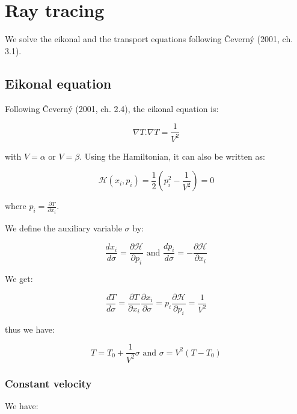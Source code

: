 \documentclass[methods.tex]{subfiles}
\begin{document}
\section{Ray tracing}

We solve the eikonal and the transport equations following \v Cevern\'y (2001, ch. 3.1).

\subsection{Eikonal equation}

Following \v Cevern\'y (2001, ch. 2.4), the eikonal equation is:

\begin{equation}
\nabla T . \nabla T = \frac{1}{V^2}
\end{equation}

with $V = \alpha$ or $V= \beta$. Using the Hamiltonian, it can also be written as:

\begin{equation}
\mathcal H (x_i, p_i) = \frac{1}{2} (p_i^2 - \frac{1}{V^2}) = 0
\end{equation}

where $p_i = \frac{\partial T}{\partial x_i}$.

We define the auxiliary variable $\sigma$ by:

\begin{equation}
\frac{dx_i}{d\sigma} = \frac{\partial \mathcal H}{\partial p_i} \text{ and } \frac{dp_i}{d\sigma} = - \frac{\partial \mathcal H}{\partial x_i}
\end{equation}

We get:

\begin{equation}
\frac{dT}{d\sigma} = \frac{\partial T}{\partial x_i} \frac{\partial x_i}{\partial \sigma} = p_i \frac{\partial \mathcal H}{\partial p_i} = \frac{1}{V^2}
\end{equation}

thus we have:

\begin{equation}
T = T_0 + \frac{1}{V^2} \sigma \text{ and } \sigma = V^2 (T - T_0)
\end{equation}

\subsubsection{Constant velocity}

We have:
\end{document}
